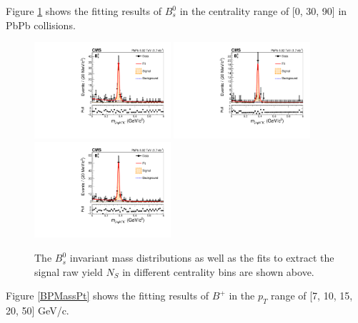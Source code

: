 Figure \ref{BsMassCent} shows the fitting results of $B^0_s$ in the centrality range of [0, 30, 90] in PbPb collisions.  

\begin{figure}[h]
\begin{center}
\includegraphics[width= 0.45\textwidth]{Figures/Chapter4/data_PbPb_1_BptNew_1050_doubly0_0_30EffInfoTreeFit.pdf}
\includegraphics[width= 0.45\textwidth]{Figures/Chapter4/data_PbPb_1_BptNew_1050_doubly0_30_90EffInfoTreeFit.pdf}
\includegraphics[width= 0.45\textwidth]{Figures/Chapter4/data_PbPb_1_BptNew_1050_doubly0_0_90EffInfoTreeFit.pdf}
\caption{The $B^0_s$ invariant mass distributions as well as the fits to extract the signal raw yield $N_{S}$ in different centrality bins are shown above.}
\label{BsMassCent}
\end{center}
\end{figure}

Figure \ref{BPMassPt} shows the fitting results of $B^+$ in the $p_T$ range of [7, 10, 15, 20, 50] GeV/c.  


